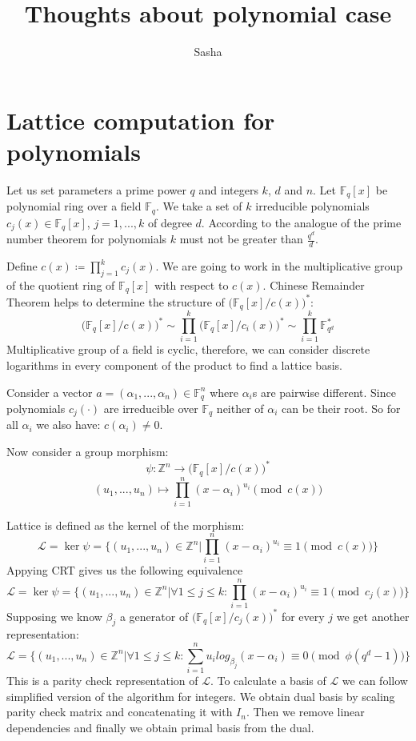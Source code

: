 \documentclass[12pt]{article}
\title{Thoughts about polynomial case}
\author{ Sasha }
\newcommand{\FF}{\mathbb{F}}
\newcommand{\zz}{\mathbb{Z}}
\newcommand{\LL}{\mathcal{L}}
\begin{document}
\maketitle

\section{Lattice computation for polynomials}
Let us set parameters a prime power $q$ and integers $k$, $d$ and $n$. Let $\FF_{q}[x]$ be polynomial ring over a field  $\FF_{q}$. We take a set of $k$ irreducible polynomials $c_{j}(x) \in \FF_{q}[x]$, $j =1, ...,k$ of degree $d$. According to the analogue of the prime number theorem for polynomials $k$ must not be greater than $\frac{q^d}{d}$.

Define $c(x) \coloneqq \prod_{j = 1}^{k} c_{j}(x)$. We are going to work in the multiplicative group of the quotient ring of  $\FF_{q}[x]$ with respect to $c(x)$.
Chinese Remainder Theorem helps to determine the structure of $\big(\FF_{q}[x]/c(x)\big)^{*}$:
\[
    \big(\FF_{q}[x]/c(x)\big)^{*} \sim \prod_{i=1}^{k}\big(\FF_{q}[x]/c_{i}(x)\big)^{*} \sim \prod_{i=1}^{k}\FF_{q^{d}}^*
\]
Multiplicative group of a field is cyclic, therefore, we can consider discrete logarithms in every component of the product to find a lattice basis.

Consider a vector $a = (\alpha_{1}, ... , \alpha_{n}) \in \FF_{q}^{n}$ where $\alpha_{i}$s are pairwise different. Since polynomials $c_{j}(\cdot)$ are irreducible over $\FF_{q}$ neither of $\alpha_{i}$ can be their root. So for all $\alpha_{i}$ we also have: $c(\alpha_{i}) \neq 0$.

Now consider a group morphism:
\[
    \psi : \zz^{n} \rightarrow \big(\FF_{q}[x]/c(x)\big)^{*}
\]
\[
    (u_{1}, ..., u_{n}) \mapsto \prod_{i=1}^{n}(x - \alpha_{i})^{u_{i}} \pmod{c(x)}
\]

Lattice is defined as the kernel of the morphism:
\[
    \LL = \ker \psi = \{(u_{1}, ..., u_{n}) \in \zz^{n} | \prod_{i=1}^{n}(x - \alpha_{i})^{u_{i}} \equiv 1 \pmod{c(x)}\}
\]
Appying CRT gives us the following equivalence
\[
    \LL = \ker \psi = \{(u_{1}, ..., u_{n}) \in \zz^{n} |  \forall 1 \leq j \leq k: \prod_{i=1}^{n}(x - \alpha_{i})^{u_{i}} \equiv 1 \pmod{c_{j}(x)}\}
\]
Supposing we know $\beta_{j}$ a generator of $\big(\FF_{q}[x]/c_{j}(x)\big)^{*}$ for every $j$ we get another representation:
\[
    \LL = \{(u_{1}, ..., u_{n}) \in \zz^{n} | \forall 1 \leq j \leq k: \sum_{i=1}^{n}u_{i}log_{\beta_{j}}(x - \alpha_{i}) \equiv 0 \pmod{\phi(q^{d} -1)}\}
\]
This is a parity check representation of $\LL$.
To calculate a basis of $\LL$ we can follow simplified version of the algorithm for integers. We obtain dual basis by scaling parity check matrix and concatenating it with $I_{n}$. Then we remove linear dependencies and finally we obtain primal basis from the dual.
\end{document}
